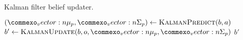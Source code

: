 \begin{algorithm}[t]
    \caption{Kalman filter belief updater.}
    \label{alg:kalman_filter}
    \begin{algorithmic}
    \State $(\vec{\mu}_p, \vec{\Sigma}_p) \leftarrow \textproc{KalmanPredict}(b, a)$ 
    \State $b' \leftarrow \textproc{KalmanUpdate}(b, o, \vec{\mu}_p, \vec{\Sigma}_p)$ 
    \State \Return $b'$
    \EndFunction
    \end{algorithmic}
\end{algorithm}
